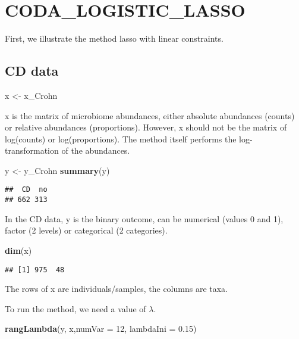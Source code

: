 \documentclass[]{book}
\newenvironment{Shaded}{\begin{snugshade}}{\end{snugshade}}
\newcommand{\KeywordTok}[1]{\textcolor[rgb]{0.13,0.29,0.53}{\textbf{#1}}}
\newcommand{\DataTypeTok}[1]{\textcolor[rgb]{0.13,0.29,0.53}{#1}}
\newcommand{\DecValTok}[1]{\textcolor[rgb]{0.00,0.00,0.81}{#1}}
\newcommand{\FloatTok}[1]{\textcolor[rgb]{0.00,0.00,0.81}{#1}}
\newcommand{\StringTok}[1]{\textcolor[rgb]{0.31,0.60,0.02}{#1}}
\newcommand{\NormalTok}[1]{#1}
\begin{document}
\chapter{CODA\_LOGISTIC\_LASSO}\label{coda}

First, we illustrate the method lasso with linear constraints.

\section{CD data}\label{cd-data}

\begin{Shaded}
\begin{Highlighting}[]
\NormalTok{x <-}\StringTok{ }\NormalTok{x_Crohn }
\end{Highlighting}
\end{Shaded}

x is the matrix of microbiome abundances, either absolute abundances
(counts) or relative abundances (proportions). However, x should not be
the matrix of log(counts) or log(proportions). The method itself
performs the log-transformation of the abundances.

\begin{Shaded}
\begin{Highlighting}[]
\NormalTok{y <-}\StringTok{ }\NormalTok{y_Crohn }
\KeywordTok{summary}\NormalTok{(y)}
\end{Highlighting}
\end{Shaded}

\begin{verbatim}
##  CD  no 
## 662 313
\end{verbatim}

In the CD data, y is the binary outcome, can be numerical (values 0 and
1), factor (2 levels) or categorical (2 categories).

\begin{Shaded}
\begin{Highlighting}[]
\KeywordTok{dim}\NormalTok{(x)}
\end{Highlighting}
\end{Shaded}

\begin{verbatim}
## [1] 975  48
\end{verbatim}

The rows of x are individuals/samples, the columns are taxa.

To run the method, we need a value of \(\lambda\).

\begin{Shaded}
\begin{Highlighting}[]
\KeywordTok{rangLambda}\NormalTok{(y, x,}\DataTypeTok{numVar =} \DecValTok{12}\NormalTok{, }\DataTypeTok{lambdaIni =} \FloatTok{0.15}\NormalTok{)}
\end{Highlighting}
\end{Shaded}
\end{document}
